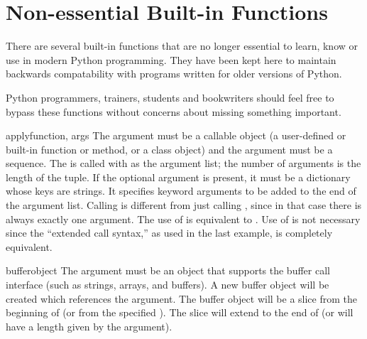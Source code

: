 

\section{Non-essential Built-in Functions \label{non-essential-built-in-funcs}}

There are several built-in functions that are no longer essential to learn,
know or use in modern Python programming.  They have been kept here to
maintain backwards compatability with programs written for older versions
of Python.

Python programmers, trainers, students and bookwriters should feel free to
bypass these functions without concerns about missing something important.



\begin{funcdesc}{apply}{function, args}
  The  argument must be a callable object (a
  user-defined or built-in function or method, or a class object) and
  the  argument must be a sequence.  The  is
  called with  as the argument list; the number of arguments
  is the length of the tuple.
  If the optional  argument is present, it must be a
  dictionary whose keys are strings.  It specifies keyword arguments
  to be added to the end of the argument list.
  Calling  is different from just calling
  , since in that case there is always
  exactly one argument.  The use of  is equivalent
  to .
  Use of  is not necessary since the ``extended call
  syntax,'' as used in the last example, is completely equivalent.

\end{funcdesc}

\begin{funcdesc}{buffer}{object}
  The  argument must be an object that supports the buffer
  call interface (such as strings, arrays, and buffers).  A new buffer
  object will be created which references the  argument.
  The buffer object will be a slice from the beginning of 
  (or from the specified ). The slice will extend to the
  end of  (or will have a length given by the 
  argument).
\end{funcdesc}


